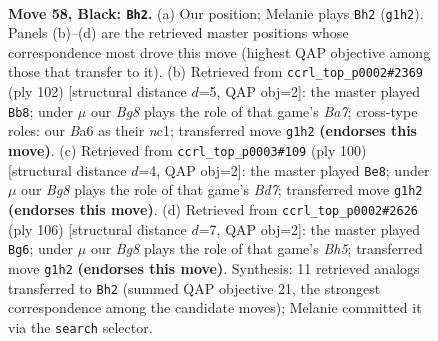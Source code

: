 \documentclass[11pt]{article}
\begin{document}
\clearpage

\begin{figure}[p]\centering
\begin{subfigure}{0.46\textwidth}\centering
\resizebox{\linewidth}{!}{%
\newchessgame
\chessboard[
  setfen={7K/8/b5p1/6k1/8/8/p7/6b1 b - - 3 58},
  showmover=false,
  pgfstyle=straightmove, color=movearrow, markmove={g1-h2}
]}
\caption{}
\end{subfigure}\hfill
\begin{subfigure}{0.46\textwidth}\centering
\resizebox{\linewidth}{!}{%
\newchessgame
\chessboard[
  setfen={8/B7/6k1/p7/6K1/6P1/8/2n5 w - - 0 52},
  showmover=false,
  pgfstyle=straightmove, color=movearrow, markmove={a7-b8}
]}
\caption{}
\end{subfigure}
\\[4pt]
\begin{subfigure}{0.46\textwidth}\centering
\resizebox{\linewidth}{!}{%
\newchessgame
\chessboard[
  setfen={8/3B4/5k2/8/7P/5K2/5P1b/8 w - - 13 51},
  showmover=false,
  pgfstyle=straightmove, color=movearrow, markmove={d7-e8}
]}
\caption{}
\end{subfigure}\hfill
\begin{subfigure}{0.46\textwidth}\centering
\resizebox{\linewidth}{!}{%
\newchessgame
\chessboard[
  setfen={8/8/4k3/K6B/P7/7p/7b/8 w - - 12 54},
  showmover=false,
  pgfstyle=straightmove, color=movearrow, markmove={h5-g6}
]}
\caption{}
\end{subfigure}
\caption{\textbf{Move 58, Black: \texttt{Bh2}.} (a) Our position; Melanie plays \texttt{Bh2} (\texttt{g1h2}). Panels (b)--(d) are the retrieved master positions whose correspondence most drove this move (highest QAP objective among those that transfer to it). (b) Retrieved from \texttt{ccrl\_top\_p0002\#2369} (ply 102) [structural distance $d$=5, QAP obj=2]: the master played \texttt{Bb8}; under $\mu$ our \emph{Bg8} plays the role of that game's \emph{Ba7}; cross-type roles: our \emph{B}a6 as their \emph{n}c1; transferred move \texttt{g1h2} \textbf{(endorses this move)}. (c) Retrieved from \texttt{ccrl\_top\_p0003\#109} (ply 100) [structural distance $d$=4, QAP obj=2]: the master played \texttt{Be8}; under $\mu$ our \emph{Bg8} plays the role of that game's \emph{Bd7}; transferred move \texttt{g1h2} \textbf{(endorses this move)}. (d) Retrieved from \texttt{ccrl\_top\_p0002\#2626} (ply 106) [structural distance $d$=7, QAP obj=2]: the master played \texttt{Bg6}; under $\mu$ our \emph{Bg8} plays the role of that game's \emph{Bh5}; transferred move \texttt{g1h2} \textbf{(endorses this move)}. Synthesis: 11 retrieved analogs transferred to \texttt{Bh2} (summed QAP objective 21, the strongest correspondence among the candidate moves); Melanie committed it via the \texttt{search} selector.}
\label{fig:thought-m115}
\end{figure}
\end{document}
